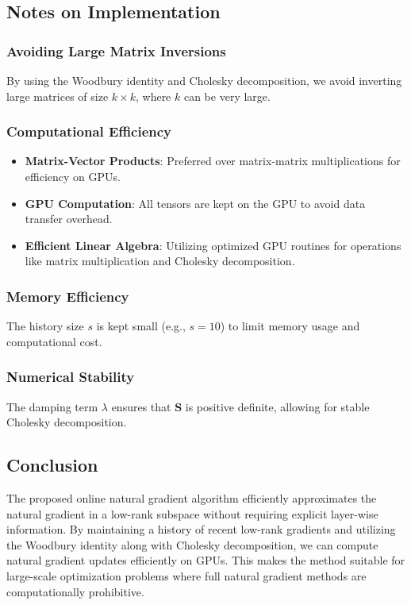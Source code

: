 \subsection{Notes on Implementation}

\subsubsection{Avoiding Large Matrix Inversions}

By using the Woodbury identity and Cholesky decomposition, we avoid inverting large matrices of size $k \times k$, where $k$ can be very large.

\subsubsection{Computational Efficiency}

\begin{itemize}
    \item \textbf{Matrix-Vector Products}: Preferred over matrix-matrix multiplications for efficiency on GPUs.
    \item \textbf{GPU Computation}: All tensors are kept on the GPU to avoid data transfer overhead.
    \item \textbf{Efficient Linear Algebra}: Utilizing optimized GPU routines for operations like matrix multiplication and Cholesky decomposition.
\end{itemize}

\subsubsection{Memory Efficiency}

The history size $s$ is kept small (e.g., $s = 10$) to limit memory usage and computational cost.

\subsubsection{Numerical Stability}

The damping term $\lambda$ ensures that $\mathbf{S}$ is positive definite, allowing for stable Cholesky decomposition.

\subsection{Conclusion}

The proposed online natural gradient algorithm efficiently approximates the natural gradient in a low-rank subspace without requiring explicit layer-wise information. By maintaining a history of recent low-rank gradients and utilizing the Woodbury identity along with Cholesky decomposition, we can compute natural gradient updates efficiently on GPUs. This makes the method suitable for large-scale optimization problems where full natural gradient methods are computationally prohibitive.